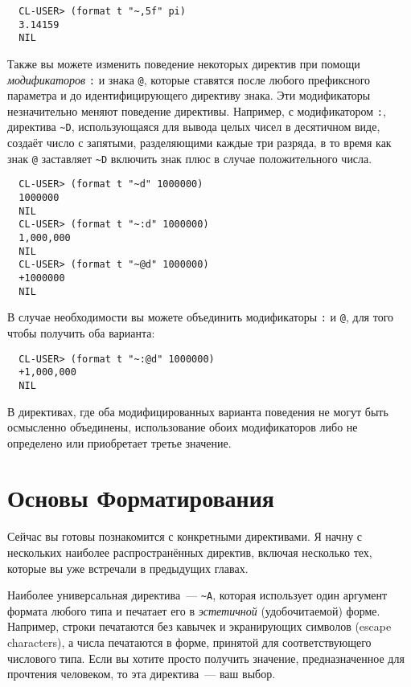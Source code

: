 {\begin{verbatim}
  CL-USER> (format t "~,5f" pi)
  3.14159
  NIL
\end{verbatim}

Также вы можете изменить поведение некоторых директив при помощи \textit{модификаторов}
\lstinline!:! и знака \lstinline!@!, которые ставятся после любого префиксного параметра и
до идентифицирующего директиву знака. Эти модификаторы незначительно меняют поведение
директивы. Например, с модификатором \lstinline!:!, директива \lstinline!~D!,
использующаяся для вывода целых чисел в десятичном виде, создаёт число с запятыми,
разделяющими каждые три разряда, в то время как знак \lstinline!@! заставляет
\lstinline!~D!  включить знак плюс в случае положительного числа.

\begin{verbatim}
  CL-USER> (format t "~d" 1000000)
  1000000
  NIL
  CL-USER> (format t "~:d" 1000000)
  1,000,000
  NIL
  CL-USER> (format t "~@d" 1000000)
  +1000000
  NIL
\end{verbatim}

В случае необходимости вы можете объединить модификаторы \lstinline!:! и \lstinline!@!,
для того чтобы получить оба варианта:

\begin{verbatim}
  CL-USER> (format t "~:@d" 1000000)
  +1,000,000
  NIL
\end{verbatim}

В директивах, где оба модифицированных варианта поведения не могут быть осмысленно
объединены, использование обоих модификаторов либо не определено или приобретает третье
значение.

\section{Основы Форматирования}

Сейчас вы готовы познакомится с конкретными директивами. Я начну с нескольких наиболее
распространённых директив, включая несколько тех, которые вы уже встречали в предыдущих
главах.

Наиболее универсальная директива~--- \lstinline!~A!, которая использует один аргумент
формата любого типа и печатает его в \textit{эстетичной} (удобочитаемой) форме. Например,
строки печатаются без кавычек и экранирующих символов (escape characters), а числа
печатаются в форме, принятой для соответствующего числового типа. Если вы хотите просто
получить значение, предназначенное для прочтения человеком, то эта директива~--- ваш выбор.

}
